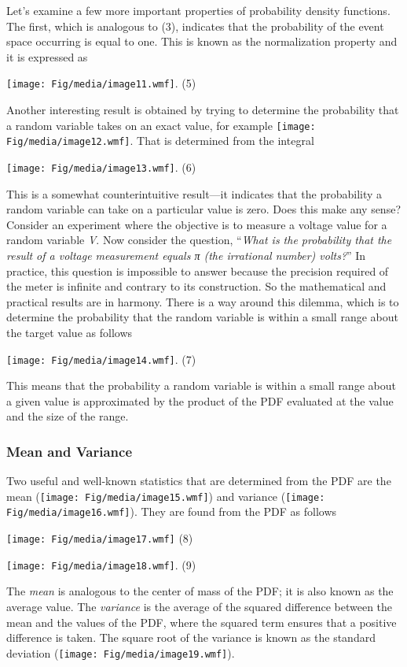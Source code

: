 Let's examine a few more important properties of probability density
functions. The first, which is analogous to (3), indicates that the
probability of the event space occurring is equal to one. This is known
as the normalization property and it is expressed as

\texttt{[image: Fig/media/image11.wmf]}. (5)

Another interesting result is obtained by trying to determine the
probability that a random variable takes on an exact value, for example
\texttt{[image: Fig/media/image12.wmf]}. That is determined from the
integral

\texttt{[image: Fig/media/image13.wmf]}. (6)

This is a somewhat counterintuitive result---it indicates that the
probability a random variable can take on a particular value is zero.
Does this make any sense? Consider an experiment where the objective is
to measure a voltage value for a random variable \emph{V}. Now consider
the question, ``\emph{What is the probability that the result of a
voltage measurement equals π (the irrational number) volts?}'' In
practice, this question is impossible to answer because the precision
required of the meter is infinite and contrary to its construction. So
the mathematical and practical results are in harmony. There is a way
around this dilemma, which is to determine the probability that the
random variable is within a small range about the target value as
follows

\texttt{[image: Fig/media/image14.wmf]}. (7)

This means that the probability a random variable is within a small
range about a given value is approximated by the product of the PDF
evaluated at the value and the size of the range.

\subsubsection{Mean and Variance}\label{mean-and-variance}

Two useful and well-known statistics that are determined from the PDF
are the mean (\texttt{[image: Fig/media/image15.wmf]}) and variance
(\texttt{[image: Fig/media/image16.wmf]}). They are found from the PDF
as follows

\texttt{[image: Fig/media/image17.wmf]} (8)

\texttt{[image: Fig/media/image18.wmf]}. (9)

The \emph{mean} is analogous to the center of mass of the PDF; it is
also known as the average value. The \emph{variance} is the average of
the squared difference between the mean and the values of the PDF, where
the squared term ensures that a positive difference is taken. The square
root of the variance is known as the standard deviation
(\texttt{[image: Fig/media/image19.wmf]}).

